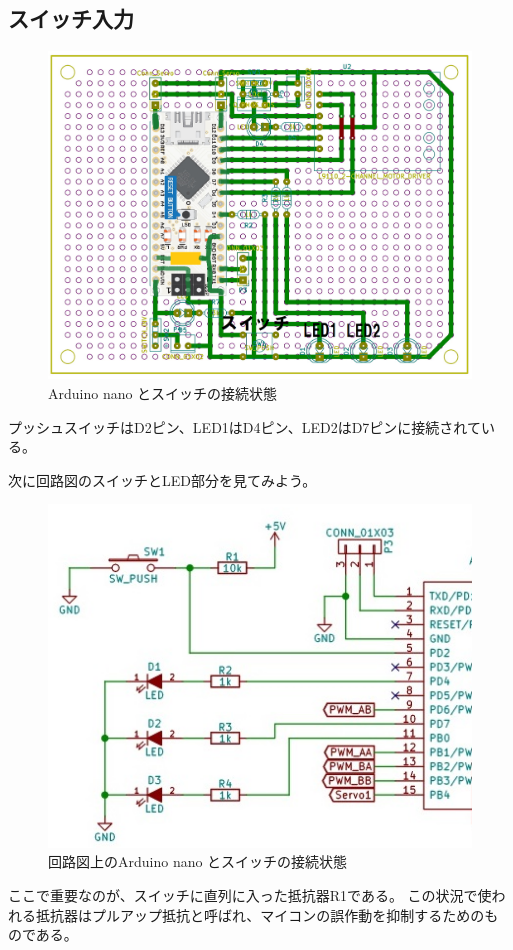 \documentclass[uplatex]{jsarticle}
\begin{document}
\subsection{スイッチ入力}
\begin{figure}[htbp]
    \centering
    \includegraphics[width=15cm]{switch_1.png}
    \caption{Arduino nano とスイッチの接続状態}
\end{figure}
プッシュスイッチはD2ピン、LED1はD4ピン、LED2はD7ピンに接続されている。

次に回路図のスイッチとLED部分を見てみよう。
\begin{figure}[htbp]
    \centering
    \includegraphics[width=15cm]{switch_2.png}
    \caption{回路図上のArduino nano とスイッチの接続状態}
\end{figure}
ここで重要なのが、スイッチに直列に入った抵抗器R1である。
この状況で使われる抵抗器はプルアップ抵抗と呼ばれ、マイコンの誤作動を抑制するためのものである。
\end{document}

